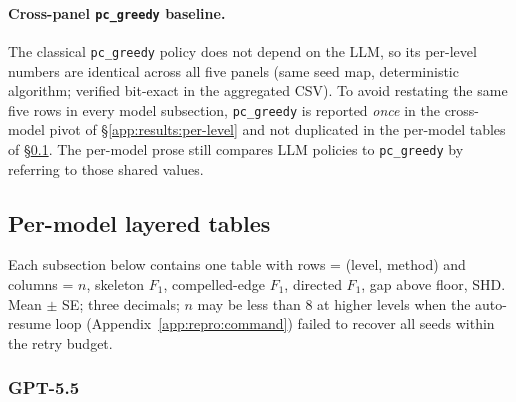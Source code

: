 \paragraph{Cross-panel \texttt{pc\_greedy} baseline.} The classical \texttt{pc\_greedy} policy does not depend on the LLM, so its per-level numbers are identical across all five panels (same seed map, deterministic algorithm; verified bit-exact in the aggregated CSV). To avoid restating the same five rows in every model subsection, \texttt{pc\_greedy} is reported \emph{once} in the cross-model pivot of \S\ref{app:results:per-level} and not duplicated in the per-model tables of \S\ref{app:results:per-model}. The per-model prose still compares LLM policies to \texttt{pc\_greedy} by referring to those shared values.

\subsection{Per-model layered tables}
\label{app:results:per-model}

Each subsection below contains one table with rows = (level, method) and columns = $n$, skeleton $F_1$, compelled-edge $F_1$, directed $F_1$, gap above floor, SHD. Mean $\pm$ SE; three decimals; $n$ may be less than 8 at higher levels when the auto-resume loop (Appendix~\ref{app:repro:command}) failed to recover all seeds within the retry budget.

\subsubsection{GPT-5.5}
\label{app:results:gpt55}

